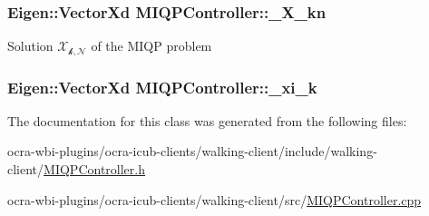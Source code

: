\hypertarget{classMIQPController_a1fdfcba2c7b6422ac8d3b0b6095d7546}{
\subsubsection[{\-\_\-\-X\-\_\-kn}]{\setlength{\rightskip}{0pt plus 5cm}\-Eigen\-::\-Vector\-Xd {\bf \-M\-I\-Q\-P\-Controller\-::\-\_\-\-X\-\_\-kn}}}\label{classMIQPController_a1fdfcba2c7b6422ac8d3b0b6095d7546}
\-Solution $\mathcal{X_{k,N}}$ of the \-M\-I\-Q\-P problem \hypertarget{classMIQPController_ad1c63725dab2ce84382fcb0b071325ed}{
\subsubsection[{\-\_\-xi\-\_\-k}]{\setlength{\rightskip}{0pt plus 5cm}\-Eigen\-::\-Vector\-Xd {\bf \-M\-I\-Q\-P\-Controller\-::\-\_\-xi\-\_\-k}}}\label{classMIQPController_ad1c63725dab2ce84382fcb0b071325ed}


\-The documentation for this class was generated from the following files\-:\begin{DoxyCompactItemize}
\item 
ocra-\/wbi-\/plugins/ocra-\/icub-\/clients/walking-\/client/include/walking-\/client/\hyperlink{MIQPController_8h}{\-M\-I\-Q\-P\-Controller.\-h}\item 
ocra-\/wbi-\/plugins/ocra-\/icub-\/clients/walking-\/client/src/\hyperlink{MIQPController_8cpp}{\-M\-I\-Q\-P\-Controller.\-cpp}\end{DoxyCompactItemize}
